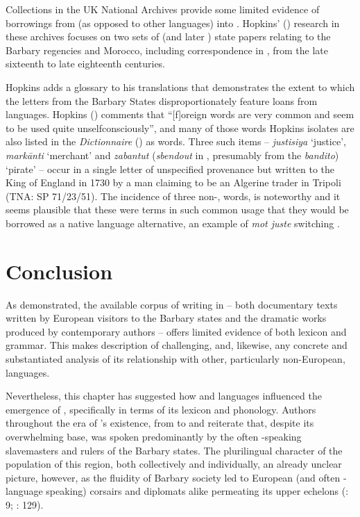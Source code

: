 \documentclass[output=paper]{langsci/langscibook}
\begin{document}
	Collections in the UK National Archives provide some limited evidence of borrowings from  (as opposed to other  languages) into . Hopkins' (\citeyear{Hopkins1982}) research in these archives focuses on two sets of  (and later ) state papers relating to the Barbary regencies and Morocco, including correspondence in , from the late sixteenth to late eighteenth centuries. 
	
	Hopkins adds a glossary to his translations that demonstrates the extent to which the  letters from the Barbary States disproportionately feature loans from  languages. Hopkins (\citeyear[x]{Hopkins1982}) comments that “[f]oreign words are very common and seem to be used quite unselfconsciously”, and many of those words Hopkins isolates are also listed in the \textit{Dictionnaire} (\citeyear{Anonymous1830}) as  words. Three such items -- \textit{justisiya} ‘justice’, \textit{markānti} ‘merchant’ and \textit{zabantut} (\textit{sbendout} in , presumably from the  \textit{bandito}) ‘pirate’ -- occur in a single letter of unspecified provenance but written to the King of England in 1730 by a man claiming to be an Algerine trader in Tripoli (TNA: SP 71/23/51). The incidence of three non-,  words, is noteworthy and it seems plausible that these were  terms in such common usage that they would be borrowed as a native language alternative, an example of \textit{mot juste} switching \citep[32]{Gardner-Chloros2009}.
	
\section{Conclusion}
	
	As demonstrated, the available corpus of writing in  – both documentary texts written by European visitors to the Barbary states and the dramatic works produced by contemporary authors – offers limited evidence of both lexicon and grammar. This makes description of  challenging, and, likewise, any concrete and substantiated analysis of its relationship with other, particularly non-European, languages.
	
	Nevertheless, this chapter has suggested how  and  languages influenced the emergence of , specifically in terms of its lexicon and phonology. Authors throughout the era of ’s existence, from \citet{Haedo1612} to \citet{Broughton1839} and \citet{Frank1850} reiterate that, despite its overwhelming  base,  was spoken predominantly by the often -speaking slavemasters and rulers of the Barbary states. The plurilingual character of the population of this region, both collectively and individually,  an already unclear picture, however, as the fluidity of Barbary society led to European (and often -language speaking) corsairs and diplomats alike permeating its upper echelons (\citealt{Haedo1612}: 9; \citealt{Garcès2011}: 129).
	
\end{document}
